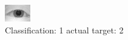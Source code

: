\begin{figure}[h!]
\begin{center}
\includegraphics[width=0.60\columnwidth]{figures/ID1019_class_1_target_2.png}
\end{center}
\caption{ Classification: 1 actual target: 2}
\label{fig:ID1019_class_1_target_2}
\end{figure}
